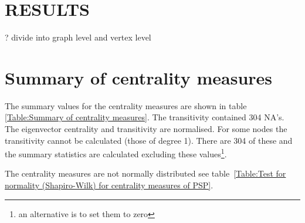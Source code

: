 







\section{RESULTS}
? divide into graph level and vertex level

\section{Summary of centrality measures}

The summary values for the centrality measures are shown in table \ref{Table:Summary of centrality measures}. The transitivity contained 304 NA's.
The eigenvector centrality and transitivity are normalised. For some nodes the transitivity cannot be calculated (those of degree 1). There are 304 of these and the summary statistics are calculated excluding these values\footnote{an alternative is to set them to zero}. 

The centrality measures are not normally distributed see table~\ref{Table:Test for normality (Shapiro-Wilk) for centrality measures of PSP}.



